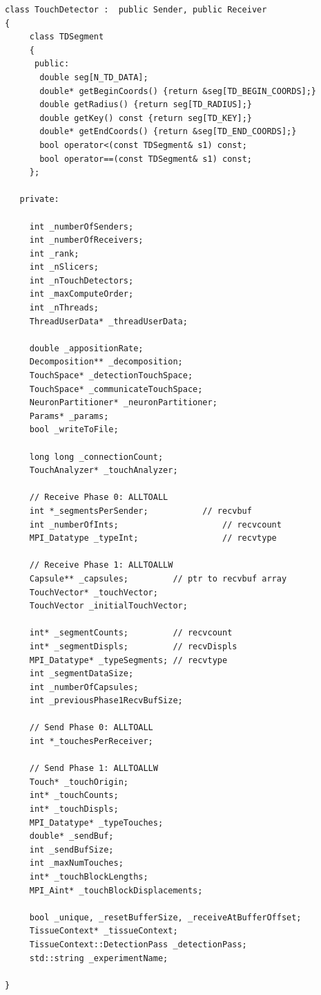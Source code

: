 {\tiny
\begin{verbatim}
class TouchDetector :  public Sender, public Receiver
{
     class TDSegment
     {
      public:
       double seg[N_TD_DATA];
       double* getBeginCoords() {return &seg[TD_BEGIN_COORDS];}
       double getRadius() {return seg[TD_RADIUS];}
       double getKey() const {return seg[TD_KEY];}
       double* getEndCoords() {return &seg[TD_END_COORDS];}
       bool operator<(const TDSegment& s1) const;
       bool operator==(const TDSegment& s1) const;
     };

   private:

     int _numberOfSenders;
     int _numberOfReceivers;
     int _rank;
     int _nSlicers;
     int _nTouchDetectors;
     int _maxComputeOrder;
     int _nThreads;
     ThreadUserData* _threadUserData;

     double _appositionRate;
     Decomposition** _decomposition;
     TouchSpace* _detectionTouchSpace;
     TouchSpace* _communicateTouchSpace;
     NeuronPartitioner* _neuronPartitioner;
     Params* _params;
     bool _writeToFile;
		 
     long long _connectionCount;
     TouchAnalyzer* _touchAnalyzer;

     // Receive Phase 0: ALLTOALL
     int *_segmentsPerSender; 		    // recvbuf
     int _numberOfInts;                     // recvcount
     MPI_Datatype _typeInt;                 // recvtype
        
     // Receive Phase 1: ALLTOALLW
     Capsule** _capsules;         // ptr to recvbuf array
     TouchVector* _touchVector;
     TouchVector _initialTouchVector;

     int* _segmentCounts;         // recvcount
     int* _segmentDispls;         // recvDispls
     MPI_Datatype* _typeSegments; // recvtype
     int _segmentDataSize;
     int _numberOfCapsules;
     int _previousPhase1RecvBufSize;
     
     // Send Phase 0: ALLTOALL
     int *_touchesPerReceiver;
     
     // Send Phase 1: ALLTOALLW
     Touch* _touchOrigin;
     int* _touchCounts;
     int* _touchDispls;
     MPI_Datatype* _typeTouches;
     double* _sendBuf;
     int _sendBufSize;
     int _maxNumTouches;
     int* _touchBlockLengths;
     MPI_Aint* _touchBlockDisplacements;

     bool _unique, _resetBufferSize, _receiveAtBufferOffset;
     TissueContext* _tissueContext;
     TissueContext::DetectionPass _detectionPass;
     std::string _experimentName;

}
\end{verbatim}
}

